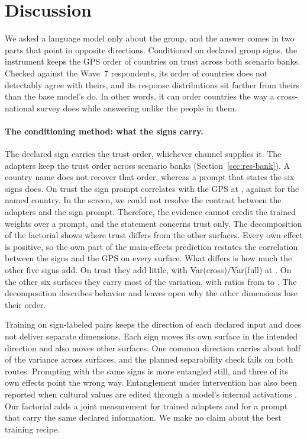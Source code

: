 \section{Discussion}\label{sec:discussion}

We asked a language model only about the group, and the answer comes in two parts that point in opposite directions. Conditioned on declared group signs, the instrument keeps the GPS order of countries on trust across both scenario banks. Checked against the Wave~7 respondents, its order of countries does not detectably agree with theirs, and its response distributions sit farther from theirs than the base model's do. In other words, it can order countries the way a cross-national survey does while answering unlike the people in them.

\paragraph{The conditioning method: what the signs carry.} The declared sign carries the trust order, whichever channel supplies it. The adapters keep the trust order across scenario banks (Section~\ref{sec:res-bank}). A country name does not recover that order, whereas a prompt that states the six signs does. On trust the sign prompt correlates with the GPS at  , against   for the named country. In the screen, we could not resolve the contrast between the adapters and the sign prompt. Therefore, the evidence cannot credit the trained weights over a prompt, and the statement concerns trust only. The decomposition of the factorial shows where trust differs from the other surfaces. Every own effect is positive, so the own part of the main-effects prediction restates the correlation between the signs and the GPS on every surface. What differs is how much the other five signs add. On trust they add little, with Var(cross)/Var(full) at . On the other six surfaces they carry most of the variation, with ratios from  to . The decomposition describes behavior and leaves open why the other dimensions lose their order.

Training on sign-labeled pairs keeps the direction of each declared input and does not deliver separate dimensions. Each sign moves its own surface in the intended direction and also moves other surfaces. One common direction carries about half of the variance across surfaces, and the planned separability check fails on both routes. Prompting with the same signs is more entangled still, and three of its own effects point the wrong way. Entanglement under intervention has also been reported when cultural values are edited through a model's internal activations \citep{dangmasud2026}. Our factorial adds a joint measurement for trained adapters and for a prompt that carry the same declared information. We make no claim about the best training recipe.

